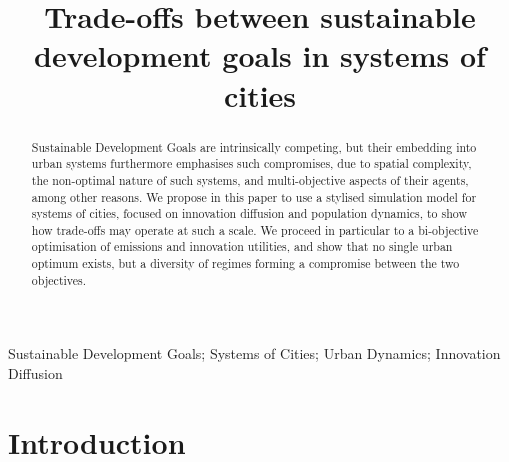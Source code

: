 \documentclass[final,5p,times,twocolumn,authoryear]{elsarticle}
\begin{document}
\begin{frontmatter}

\title{Trade-offs between sustainable development goals in systems of cities}

\author{}





\begin{abstract}
    Sustainable Development Goals are intrinsically competing, but their embedding into urban systems furthermore emphasises such compromises, due to spatial complexity, the non-optimal nature of such systems, and multi-objective aspects of their agents, among other reasons. We propose in this paper to use a stylised simulation model for systems of cities, focused on innovation diffusion and population dynamics, to show how trade-offs may operate at such a scale. We proceed in particular to a bi-objective optimisation of emissions and innovation utilities, and show that no single urban optimum exists, but a diversity of regimes forming a compromise between the two objectives.
\end{abstract}

\begin{keyword}
Sustainable Development Goals; Systems of Cities; Urban Dynamics; Innovation Diffusion
\end{keyword}

\end{frontmatter}


\linenumbers



\section{Introduction}
\end{document}
